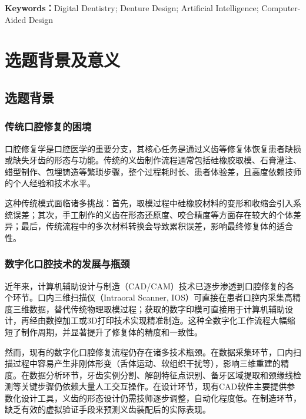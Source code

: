\documentclass[12pt,hyperref,a4paper,UTF8]{ctexart}
\begin{document}
\vspace{0.5em}
\hspace{2em}\textbf{Keywords：}Digital Dentistry; Denture Design; Artificial Intelligence; Computer-Aided Design
 
\newpage


\section{选题背景及意义}

\subsection{选题背景}

\subsubsection{传统口腔修复的困境}

口腔修复学是口腔医学的重要分支，其核心任务是通过义齿等修复体恢复患者缺损或缺失牙齿的形态与功能。传统的义齿制作流程通常包括硅橡胶取模、石膏灌注、蜡型制作、包埋铸造等繁琐步骤，整个过程耗时长、患者体验差，且高度依赖技师的个人经验和技术水平。

这种传统模式面临诸多挑战：首先，取模过程中硅橡胶材料的变形和收缩会引入系统误差；其次，手工制作的义齿在形态还原度、咬合精度等方面存在较大的个体差异；最后，传统流程中的多次材料转换会导致累积误差，影响最终修复体的适合性。

\subsubsection{数字化口腔技术的发展与瓶颈}

近年来，计算机辅助设计与制造（CAD/CAM）技术已逐步渗透到口腔修复的各个环节。口内三维扫描仪（Intraoral Scanner, IOS）可直接在患者口腔内采集高精度三维数据，替代传统物理取模过程；获取的数字印模可直接用于计算机辅助设计，再经由数控加工或3D打印技术实现精准制造。这种全数字化工作流程大幅缩短了制作周期，并显著提升了修复体的精度和一致性。

然而，现有的数字化口腔修复流程仍存在诸多技术瓶颈。在数据采集环节，口内扫描过程中容易产生非刚体形变（舌体运动、软组织干扰等），影响三维重建的精度。在数据分析环节，牙齿实例分割、解剖特征点识别、备牙区域提取和颈缘线检测等关键步骤仍依赖大量人工交互操作。在设计环节，现有CAD软件主要提供参数化设计工具，义齿的形态设计仍需技师逐步调整，自动化程度低。在制造环节，缺乏有效的虚拟验证手段来预测义齿装配后的实际表现。
\end{document}
